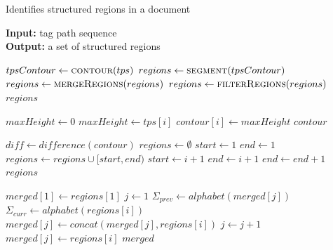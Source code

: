\documentclass{vldb}
\begin{document}
\begin{algorithm}
\caption{Identifies structured regions in a document}
\label{alg:idreg}
\textbf{Input:} tag path sequence \\
\textbf{Output:} a set of structured regions

\begin{algorithmic}[1]

 
\State $tpsContour \leftarrow \Call{contour}{tps}$
\State $regions \leftarrow \Call{segment}{tpsContour}$
\State $regions \leftarrow \Call{mergeRegions}{regions}$
\State $regions \leftarrow \Call{filterRegions}{regions}$
\State \Return $regions$
\EndFunction


 
\State $maxHeight \leftarrow 0$ 
\label{line:alg:idreg:a}
\label{line:alg:idreg:b}
\State $maxHeight \leftarrow tps[i]$ 
\EndIf 
\State $contour[i] \leftarrow maxHeight$ 
\EndFor\label{line:alg:idreg:c} 
\State \Return $contour$ \label{line:alg:idreg:d} 
\EndFunction


 
\State $diff \leftarrow difference(contour)$\label{line:alg:idreg:e}
\State $regions \leftarrow \emptyset$\label{line:alg:idreg:f}
\State $start \leftarrow 1$
\State $end \leftarrow 1$
\State $regions \leftarrow regions \cup [start, end)$
\EndIf
\State $start \leftarrow i + 1$
\State $end \leftarrow i + 1$
\Else
\State $end \leftarrow end + 1$
\EndIf
\EndFor\label{line:alg:idreg:g}
\State \Return $regions$\label{line:alg:idreg:h}
\EndFunction


 
\State $merged[1] \leftarrow regions[1]$
\State $j \leftarrow 1$ 
\label{line:alg:idreg:i}
\State $\Sigma_{prev} \leftarrow alphabet(merged[j])$ \label{line:alg:idreg:j}
\State $\Sigma_{curr} \leftarrow alphabet(regions[i])$
\State $merged[j] \leftarrow concat(merged[j], regions[i])$
\Else 
\State $j \leftarrow j + 1$ 
\State $merged[j] \leftarrow regions[i]$ 
\EndIf \label{line:alg:idreg:k}
\EndFor
\State 
\Return $merged$ \label{line:alg:idreg:l}
\EndFunction


\end{algorithmic}
\end{algorithm}
\end{document}
